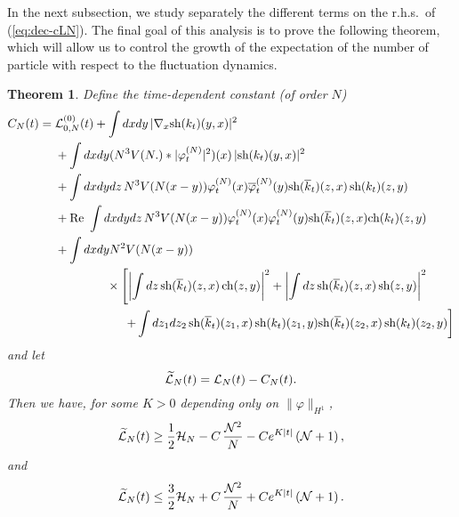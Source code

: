 \documentclass[11pt,a4paper]{article}
\newtheorem{thm}{Theorem}[section]  %
\newcommand{\ech}[2]{#2}	%
\newcommand{\ekt}{e^{K\lvert t\rvert}}	%
\newcommand{\wt}{\widetilde}
\newcommand{\cH}{{\cal H}}
\newcommand{\cL}{{\cal L}}
\newcommand{\cN}{{\cal N}}
\newcommand{\norm}[1]{\lVert#1\rVert}	%
\begin{document}
In the next subsection, we study separately the different terms on the r.h.s.\ of (\ref{eq:dec-cLN}). The final goal of this analysis is to prove the following theorem, which will allow us to control the growth of the expectation of the number of particle with respect to the fluctuation dynamics.
%
%
\begin{thm}\label{thm:L}
Define the time-dependent constant (of order $N$)
\begin{equation}\label{eq:CNt} \begin{split} 
C_N (t) = \; &\cL^{(0)}_{0,N} (t) + \int dx dy \, |\nabla_x \text{sh} (k_t) (y,x)|^2  \\
 &+  \int dx dy (N^3 V(N.) * |\varphi_t^{(N)}|^2) (x) \, |\text{sh} (k_t) (y,x)|^2 \\
 &+ \int dx dy dz \, N^3 V(N (x-y)) \varphi_t^{(N)} (x) \overline{\varphi}_t^{(N)} (y) \text{sh} (\overline{k}_t) (z,x)  \, \text{sh} (k_t) (z,y)  \\
 &+ \text{Re } \int dx dy dz \, N^3 V(N (x-y)) \varphi_t^{(N)} (x) \varphi_t^{(N)} (y) \text{sh} (\overline{k}_t) (z,x) \text{ch} (k_t) (z,y)  \\
&+ \int dx dy N^2 V(N (x-y)) \\ &\hspace{1.5cm}  \times \left[ \left|\int dz \, \text{sh} (\overline{k}_t) (z,x) \, \text{ch} (z,y) \right|^2  + \left| \int dz \, \text{sh} (\overline{k}_t) (z,x) \, \text{sh} (z,y) \right|^2 \right. \\ &\hspace{2cm}  \left. 
+  \int dz_1 dz_2 \, \text{sh} (\overline{k}_t) (z_1,x) \, \text{sh} (k_t) (z_1,y)  \text{sh} (\overline{k}_t) (z_2,x) \, \text{sh} (k_t) (z_2,y) \right] 
\end{split} \end{equation}
and let
\begin{equation}\label{eq:wtcL} \wt{\cL}_N (t) = \cL_N (t) - C_N (t). \end{equation}
Then we have, for some $K > 0$ depending only on $\norm{\varphi}_{H^1}$,
\begin{equation}\label{eq:thmL-1} \wt{\cL}_N (t) \geq \frac{1}{2} \cH_N - C \, \frac{\cN^2}{N}  - C \ech{\| \varphi_t^{(N)} \|_{H^2}^2}{\ekt}  \left(\cN + 1\right), \end{equation}
and
\begin{equation}\label{eq:thmL-1b} \wt{\cL}_N (t) \leq \frac{3}{2} \cH_N + C \, \frac{\cN^2}{N}  +  C \ech{\| \varphi_t^{(N)} \|_{H^2}^2}{\ekt}  \left(\cN + 1\right). \end{equation}

\end{thm}
\end{document}
